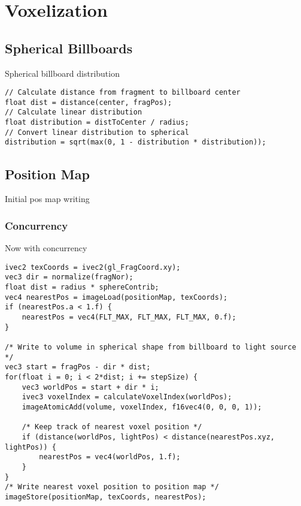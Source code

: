 \newpage

\section{Voxelization}\par

\subsection{Spherical Billboards}\par

Spherical billboard distribution

\begin{lstlisting}[title={first\_voxelize.glsl, 55}]
// Calculate distance from fragment to billboard center
float dist = distance(center, fragPos);
// Calculate linear distribution
float distribution = distToCenter / radius;
// Convert linear distribution to spherical
distribution = sqrt(max(0, 1 - distribution * distribution));
\end{lstlisting}

\subsection{Position Map}\par
Initial pos map writing

\subsubsection{Concurrency}\par
Now with concurrency

\begin{lstlisting}[title={first\_voxelize.glsl, 55}]
ivec2 texCoords = ivec2(gl_FragCoord.xy);
vec3 dir = normalize(fragNor); 
float dist = radius * sphereContrib;
vec4 nearestPos = imageLoad(positionMap, texCoords);
if (nearestPos.a < 1.f) {
    nearestPos = vec4(FLT_MAX, FLT_MAX, FLT_MAX, 0.f);
}

/* Write to volume in spherical shape from billboard to light source */
vec3 start = fragPos - dir * dist;
for(float i = 0; i < 2*dist; i += stepSize) {
    vec3 worldPos = start + dir * i;
    ivec3 voxelIndex = calculateVoxelIndex(worldPos);
    imageAtomicAdd(volume, voxelIndex, f16vec4(0, 0, 0, 1));

    /* Keep track of nearest voxel position */
    if (distance(worldPos, lightPos) < distance(nearestPos.xyz, lightPos)) {
        nearestPos = vec4(worldPos, 1.f);
    }
}
/* Write nearest voxel position to position map */
imageStore(positionMap, texCoords, nearestPos);
\end{lstlisting}

